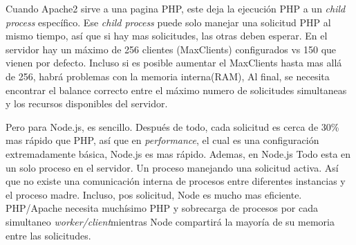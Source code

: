 Cuando Apache2 sirve a una pagina PHP, este deja la ejecución PHP a un \textit{child process} específico. Ese \textit{child process} puede solo manejar una solicitud PHP al mismo tiempo, así que si hay mas solicitudes, las otras deben esperar. En el servidor hay un máximo de 256 clientes (MaxClients) configurados vs 150 que vienen por defecto. Incluso si es posible aumentar el MaxClients hasta mas allá de 256, habrá problemas con la memoria interna(RAM), Al final, se necesita encontrar el balance correcto entre el máximo numero de solicitudes simultaneas y los recursos disponibles del servidor.

Pero para Node.js, es sencillo. Después de todo, cada solicitud es cerca de 30\% mas rápido que PHP, así que en \textit{performance}, el cual es una configuración extremadamente básica, Node.js es mas rápido. Ademas, en Node.js Todo esta en un solo proceso en el servidor. Un proceso manejando una solicitud activa. Así que no existe una comunicación interna de procesos entre diferentes instancias y el proceso madre. Incluso, pos solicitud, Node es mucho mas eficiente. PHP/Apache necesita muchísimo PHP y sobrecarga de procesos por cada simultaneo  \textit{worker/client}mientras Node compartirá la mayoría de su memoria entre las solicitudes.



